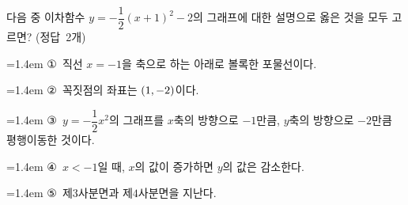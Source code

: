 다음 중 이차함수 $y=-\dfrac{1}{2}(x+1)^2-2$의 그래프에 대한 설명으로 옳은 것을 모두 고르면? \mbox{(정답 2개)}
\par\medskip\par\noindent\hangindent=1.4em {\small ①}\ 직선 $x=-1$을 축으로 하는 아래로 볼록한 포물선이다.\par\noindent\hangindent=1.4em {\small ②}\ 꼭짓점의 좌표는 $(1{,}\mkern3mu\mathopen{}-2)$이다.\par\noindent\hangindent=1.4em {\small ③}\ $y=-\dfrac{1}{2}x^2$의 그래프를 $x$축의 방향으로 $-1$만큼, $y$축의 방향으로 $-2$만큼 평행이동한 것이다.\par\noindent\hangindent=1.4em {\small ④}\ $x<-1$일 때, $x$의 값이 증가하면 $y$의 값은 감소한다.\par\noindent\hangindent=1.4em {\small ⑤}\ 제$3$사분면과 제$4$사분면을 지난다.\par\medskip
